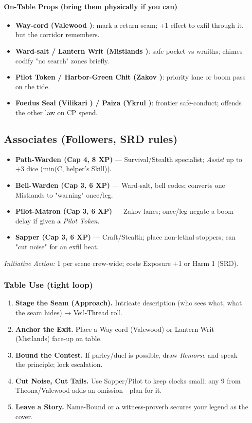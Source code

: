 \paragraph{On-Table Props (bring them physically if you can)}
\begin{itemize}
  \item \textbf{Way-cord (Valewood \SuitDiamond{})}: mark a return seam; +1 effect to exfil through it, but the corridor remembers.
  \item \textbf{Ward-salt / Lantern Writ (Mistlands \SuitDiamond{})}: safe pocket vs wraiths; chimes codify "no search" zones briefly.
  \item \textbf{Pilot Token / Harbor-Green Chit (Zakov \SuitDiamond{})}: priority lane or boom pass on the tide.
  \item \textbf{Foedus Seal (Vilikari \SuitDiamond{}) / Paiza (Ykrul \SuitDiamond{})}: frontier safe-conduct; offends the other law on CP spend.
\end{itemize}

\subsection{Associates (Followers, SRD rules)}
\begin{itemize}
  \item \textbf{Path-Warden (Cap 4, 8 XP)} — Survival/Stealth specialist; \emph{Assist} up to +3 dice (min(C, helper's Skill)).
  \item \textbf{Bell-Warden (Cap 3, 6 XP)} — Ward-salt, bell codes; converts one Mistlands \SuitClub{} to "warning" once/leg.
  \item \textbf{Pilot-Matron (Cap 3, 6 XP)} — Zakov lanes; once/leg negate a boom delay if given a \emph{Pilot Token}.
  \item \textbf{Sapper (Cap 3, 6 XP)} — Craft/Stealth; place non-lethal stoppers; can "cut noise" for an exfil beat.
\end{itemize}
\emph{Initiative Action:} 1 per scene crew-wide; costs Exposure +1 or Harm 1 (SRD).

\subsubsection{Table Use (tight loop)}
\begin{enumerate}
  \item \textbf{Stage the Seam (Approach).} Intricate description (who sees what, what the seam hides) → Veil-Thread roll.
  \item \textbf{Anchor the Exit.} Place a Way-cord (Valewood) or Lantern Writ (Mistlands) \SuitDiamond{} face-up on table.
  \item \textbf{Bound the Contest.} If parley/duel is possible, draw \emph{Remorse} and speak the principle; lock escalation.
  \item \textbf{Cut Noise, Cut Tails.} Use Sapper/Pilot to keep clocks small; any 9 from Theona/Valewood adds an omission—plan for it.
  \item \textbf{Leave a Story.} Name-Bound or a witness-proverb secures your legend as the cover.
\end{enumerate}

